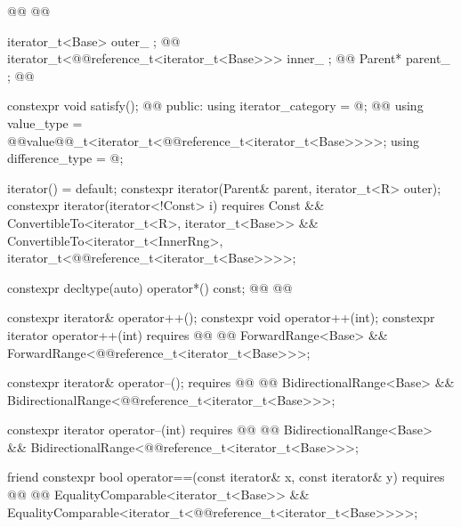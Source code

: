 {\begin{codeblock}
{{    @@
      @@

    iterator_t<Base> outer_ {};                               @\newtxt{// \expos}@
    iterator_t<@@reference_t<iterator_t<Base>>> inner_ {}; @\newtxt{// \expos}@
    Parent* parent_ {};                                       @\newtxt{// \expos}@

    constexpr void satisfy();                                 @\newtxt{// \expos}@
  public:
    using iterator_category = @\seebelownc@;
    @@
    using value_type = @@value@@_t<iterator_t<@@reference_t<iterator_t<Base>>>>;
    using difference_type = @\seebelownc@;

    iterator() = default;
    constexpr iterator(Parent& parent, iterator_t<R> outer);
    constexpr iterator(iterator<!Const> i) requires Const &&
      ConvertibleTo<iterator_t<R>, iterator_t<Base>> &&
      ConvertibleTo<iterator_t<InnerRng>,
        iterator_t<@@reference_t<iterator_t<Base>>>>;

    constexpr decltype(auto) operator*() const;
    @@
      @@

    constexpr iterator& operator++();
    constexpr void operator++(int);
    constexpr iterator operator++(int)
      requires @@
        @@ ForwardRange<Base> &&
        ForwardRange<@@reference_t<iterator_t<Base>>>;

    constexpr iterator& operator--();
      requires @@
        @@ BidirectionalRange<Base> &&
        BidirectionalRange<@@reference_t<iterator_t<Base>>>;

    constexpr iterator operator--(int)
      requires @@
        @@ BidirectionalRange<Base> &&
        BidirectionalRange<@@reference_t<iterator_t<Base>>>;

    friend constexpr bool operator==(const iterator& x, const iterator& y)
      requires @@
        @@ EqualityComparable<iterator_t<Base>> &&
        EqualityComparable<iterator_t<@@reference_t<iterator_t<Base>>>>;

}}
\end{codeblock}}

